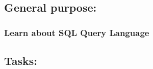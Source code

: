 \documentclass[12pt]{article}
\begin{document}
        \pagebreak
        \subsection*{ General purpose:}
        \subsubsection*{ Learn about SQL Query Language}
        
        \subsection*{Tasks:}
                
                        

                
                
\end{document}
